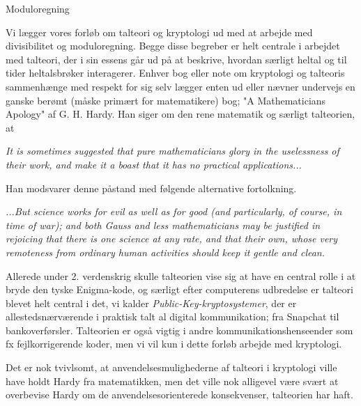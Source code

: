 
\begin{center}
	\Huge
	Moduloregning
\end{center}

Vi lægger vores forløb om talteori og kryptologi ud med at arbejde med divisibilitet og moduloregning. Begge disse begreber er helt centrale i arbejdet med talteori, der i sin essens går ud på at beskrive, hvordan særligt heltal og til tider heltalsbrøker interagerer. Enhver bog eller note om kryptologi og talteoris sammenhænge med respekt for sig selv lægger enten ud eller nævner undervejs en ganske berømt (måske primært for matematikere) bog; "A Mathematicians Apology" af G. H. Hardy. Han siger om den rene matematik og særligt talteorien, at 
\begin{center}
	\begin{minipage}{0.8\textwidth}
	\textit{It is sometimes suggested that pure mathematicians glory in the uselessness of their work,
	and make it a boast that it has no practical applications...}
	\end{minipage}
\end{center}
Han modsvarer denne påstand med følgende alternative fortolkning.
\begin{center}
	\begin{minipage}{0.8\textwidth}
	\textit{...But science works for evil as well as for good (and particularly, of course, in time of war);
	 and both Gauss and less mathematicians may be justified in rejoicing that there is one science at any rate,
	 and that their own, whose very remoteness from ordinary human activities should keep it gentle and clean.}
	\end{minipage}
\end{center}
Allerede under 2. verdenskrig skulle talteorien vise sig at have en central rolle i at bryde den tyske Enigma-kode, og særligt efter computerens udbredelse er talteori blevet helt central i det, vi kalder \textit{Public-Key-kryptosystemer}, der er allestedsnærværende i praktisk talt al digital kommunikation; fra Snapchat til bankoverførsler. Talteorien er også vigtig i andre kommunikationshenseender som fx fejlkorrigerende koder, men vi vil kun i dette forløb arbejde med kryptologi.

Det er nok tvivlsomt, at anvendelsesmulighederne af talteori i kryptologi ville have holdt Hardy fra matematikken, men det ville nok alligevel være svært at overbevise Hardy om de anvendelsesorienterede konsekvenser, talteorien har haft.
 

